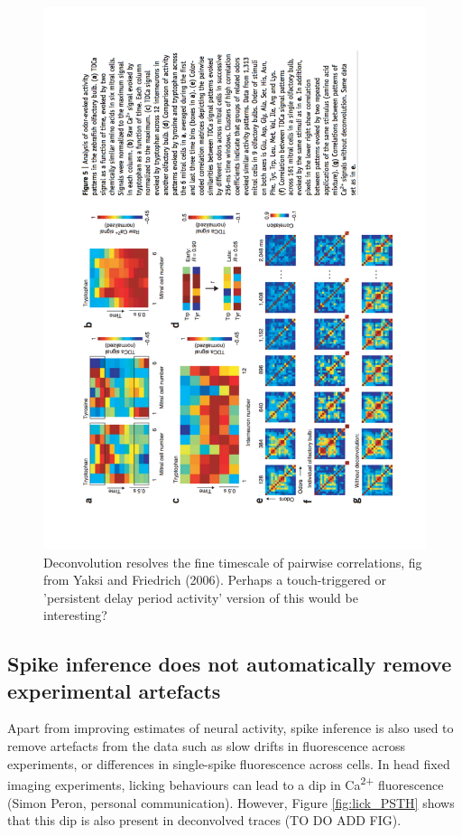 \documentclass[a4paper]{article}
\begin{document}
\begin{figure}[h]
\centering
\includegraphics[height=\textwidth, angle = 270]{Yaksi_results2.pdf}
\caption{\label{fig:Yaksi_time} Deconvolution resolves the fine timescale of pairwise correlations, fig from Yaksi and Friedrich (2006). Perhaps a touch-triggered or 'persistent delay period activity' version of this would be interesting?}
\end{figure}

\clearpage
\subsection*{Spike inference does not automatically remove experimental artefacts}
Apart from improving estimates of neural activity, spike inference is also used to remove artefacts from the data such as slow drifts in fluorescence across experiments, or differences in single-spike fluorescence across cells. In head fixed imaging experiments, licking behaviours can lead to a dip in Ca\textsuperscript{2+} fluorescence (Simon Peron, personal communication). However, Figure \ref{fig:lick_PSTH} shows that this dip is also present in deconvolved traces (TO DO ADD FIG).
\end{document}
